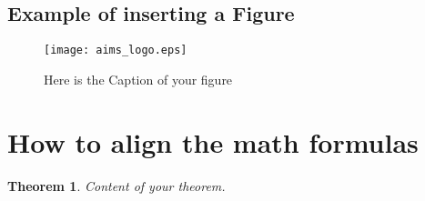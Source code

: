 \documentclass{aims}
\newtheorem{theorem}{Theorem}[section]
\theoremstyle{definition}
\begin{document}
\subsection{Example of inserting a Figure}

\begin{figure}[htp]
\begin{center}
  \texttt{[image: aims\_logo.eps]}\\
  \caption{Here is the Caption of your figure}\label{AIMS}
  \end{center}
\end{figure}


\section{How to align the math formulas}

\begin{theorem} \label{result2}
        Content of your theorem.
\end{theorem}
\end{document}
